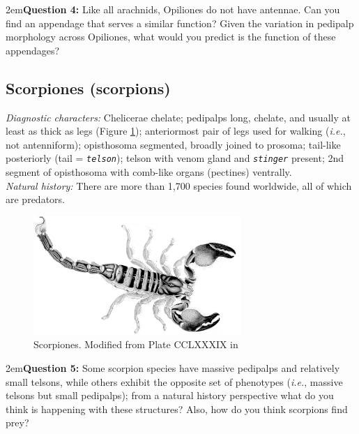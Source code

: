 \documentclass[letterpaper, 11pt]{article}
\newcommand{\latinword}[1]{\texttt{\itshape #1}}%
\begin{document}
\hangindent2em\textbf{Question 4:} Like all arachnids, Opiliones do not have antennae. Can you find an appendage that serves a similar function? Given the variation in pedipalp morphology across Opiliones, what would you predict is the function of these appendages?\vspace{2cm}

\FloatBarrier
\subsection{Scorpiones (scorpions)}
\noindent{}\textit{Diagnostic characters:} Chelicerae chelate; pedipalps long, chelate, and usually at least as thick as legs (Figure \ref{fig:scorpion}); anteriormost pair of legs used for walking (\textit{i.e.}, not antenniform); opisthosoma segmented, broadly joined to prosoma; tail-like posteriorly (tail = \latinword{telson}); telson with venom gland and \latinword{stinger} present; 2nd segment of opisthosoma with comb-like organs (pectines) ventrally.\\

\noindent{}\textit{Natural history:} There are more than 1,700 species found worldwide, all of which are predators.\\

\begin{figure}[ht!]
  \centering
    \includegraphics[width=0.7\textwidth]{scorpCCLXXXIX.png}
  \caption{Scorpiones. Modified from Plate CCLXXXIX in \cite{bhlitem55834arach}}
  \label{fig:scorpion}
\end{figure}

\hangindent2em\textbf{Question 5:} Some scorpion species have massive pedipalps and relatively small telsons, while others exhibit the opposite set of phenotypes (\textit{i.e.}, massive telsons but small pedipalps); from a natural history perspective what do you think is happening with these structures? Also, how do you think scorpions find prey?\vspace{5cm} %
\end{document}
